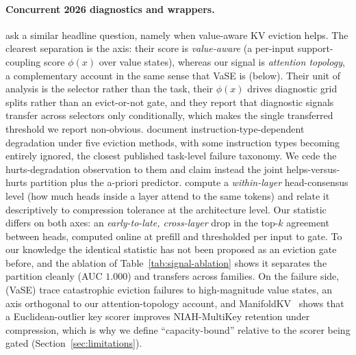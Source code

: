 \paragraph{Concurrent 2026 diagnostics and wrappers.}
\citet{arxiv260508234} ask a similar headline question, namely when
value-aware KV eviction helps. The clearest separation is the axis: their
score is \emph{value-aware} (a per-input support-coupling score $\phi(x)$
over value states), whereas our signal is \emph{attention topology}, a
complementary account in the same sense that VaSE is (below). Their unit
of analysis is the selector rather than the task, their $\phi(x)$ drives
diagnostic grid splits rather than an evict-or-not gate, and they report
that diagnostic signals transfer across selectors only conditionally,
which makes the single transferred threshold we report non-obvious.
\citet{arxiv251000231} document instruction-type-dependent degradation
under five eviction methods, with some instruction types becoming
entirely ignored, the closest published task-level failure taxonomy. We
cede the hurts-degradation observation to them and claim instead the
joint helps-versus-hurts partition plus the a-priori predictor.
\citet{arxiv260301426} compute a \emph{within-layer} head-consensus level
(how much heads inside a layer attend to the same tokens) and relate it
descriptively to compression tolerance at the architecture level. Our
statistic differs on both axes: an \emph{early-to-late, cross-layer} drop
in the top-$k$ agreement between heads, computed online at prefill and
thresholded per input to gate. To our knowledge the identical statistic
has not been proposed as an eviction gate before, and the ablation of
Table~\ref{tab:signal-ablation} shows it separates the partition cleanly
(AUC $1.000$) and transfers across families. On the failure side,
\citet{arxiv260603928} (VaSE) trace catastrophic eviction failures to
high-magnitude value states, an axis orthogonal to our attention-topology
account, and ManifoldKV~\citep{arxiv260208343} shows that a
Euclidean-outlier key scorer improves NIAH-MultiKey retention under
compression, which is why we define ``capacity-bound'' relative to the
scorer being gated (Section~\ref{sec:limitations}).

